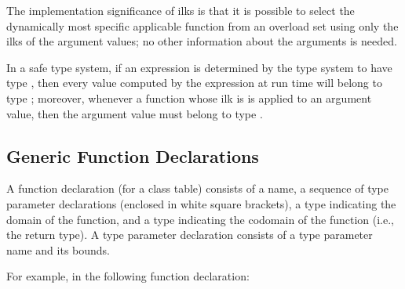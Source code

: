 \documentclass[10pt]{sigplanconf}
\newcommand{\TODO}[1]{\textbf{\emph{\textcolor{red}{TODO}}}: \textsf{\footnotesize #1}}
\renewcommand{\bar}{\overline}
\newcommand{\extends}{\ensuremath{<:}}
\newcommand{\ob}[1]{\ensuremath{\llbracket {#1} \rrbracket}}
\newcommand{\bd}[1]{\ensuremath{\{\bar{#1}\}}}
\newcommand{\bds}[2]{\ensuremath{\bar{{#1} \extends \bd{#2}}}}
\newcommand{\tplist}[2]{\ensuremath{\ob{\bds{#1}{#2}}}}
\newcommand{\decl}[3]{\mbox{\ensuremath{{#1}\,{#2}\!:\!{#3}}}}
\newcommand{\declg}[5]{\mbox{\ensuremath{#1 \tplist{#2}{#3}\, #4\!:\!#5}}}
\begin{document}
The implementation significance of ilks is that it is possible to
select the dynamically most specific applicable function
from an overload set using only the ilks of the argument values; no
other information about the arguments is needed.

In a safe type system,
if an expression is determined by the type system to have type , 
then every value computed by the expression at run time
will belong to type ; 
moreover, 
whenever a function whose ilk is  is applied to an argument value,
then the argument value must belong to type .


\subsection{Generic Function Declarations}
\label{terms}


A function declaration (for a class table) 
consists of 
a name, 
a sequence of type parameter declarations 
(enclosed in white square brackets), 
a type indicating the domain of the function, 
and a type indicating the codomain of the function
(i.e., the return type).  
A type parameter declaration consists of
a type parameter name and its bounds.

For example, in the following function declaration:
\end{document}
